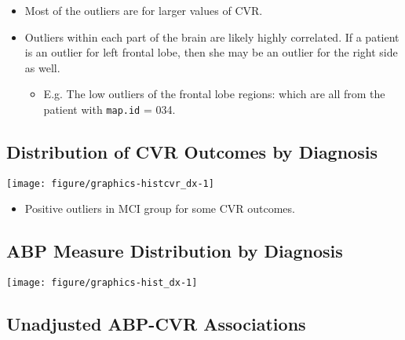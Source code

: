 \documentclass[10pt]{article}\usepackage[]{graphicx}\usepackage[]{color}
\makeatletter
\def\maxwidth{ %
  \ifdim\Gin@nat@width>\linewidth
    \linewidth
  \else
    \Gin@nat@width
  \fi
}
\newenvironment{knitrout}{}{} %
\newcommand{\code}[1]{\texttt{\smaller #1}}
\makeatother
\begin{document}
\begin{itemize}
  \item Most of the outliers are for larger values of CVR. 
  \item Outliers within each part of the brain are likely highly correlated. If a patient is an outlier for left frontal lobe, then she may be an outlier for the right side as well. 
  \begin{itemize}
    \item E.g. The low outliers of the frontal lobe regions: which are all from the patient with \code{map.id} = 034.
  \end{itemize}
\end{itemize}

\clearpage
\subsection{Distribution of CVR Outcomes by Diagnosis}

\begin{knitrout}
\color{fgcolor}

{\centering \texttt{[image: figure/graphics-histcvr\_dx-1]} 

}



\end{knitrout}

\begin{itemize}
  \item Positive outliers in MCI group for some CVR outcomes.
\end{itemize}

\clearpage
\subsection{ABP Measure Distribution by Diagnosis}

\begin{knitrout}
\color{fgcolor}

{\centering \texttt{[image: figure/graphics-hist\_dx-1]} 

}



\end{knitrout}

\clearpage
\subsection{Unadjusted ABP-CVR Associations}
\end{document}
